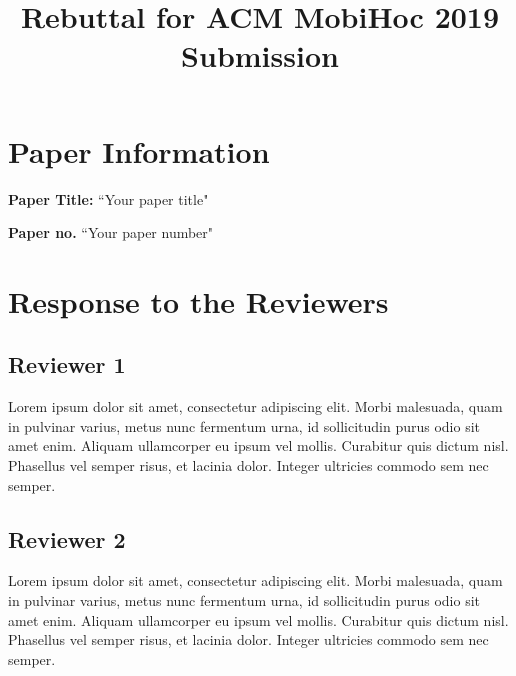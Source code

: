 \documentclass[nonacm,sigconf]{acmart}
\begin{document}
\title{Rebuttal for ACM MobiHoc 2019 Submission}

\maketitle





\section{Paper Information}

{\bf \noindent Paper Title:} ``Your paper title" 

{\bf \noindent Paper no.} ``Your paper number" 

\section{Response to the Reviewers}

\subsection{Reviewer 1}

Lorem ipsum dolor sit amet, consectetur adipiscing elit. Morbi malesuada, quam in pulvinar varius, metus nunc fermentum urna, id sollicitudin purus odio sit amet enim. Aliquam ullamcorper eu ipsum vel mollis. Curabitur quis dictum nisl. Phasellus vel semper risus, et lacinia dolor. Integer ultricies commodo sem nec semper.


\subsection{Reviewer 2}
Lorem ipsum dolor sit amet, consectetur adipiscing elit. Morbi malesuada, quam in pulvinar varius, metus nunc fermentum urna, id sollicitudin purus odio sit amet enim. Aliquam ullamcorper eu ipsum vel mollis. Curabitur quis dictum nisl. Phasellus vel semper risus, et lacinia dolor. Integer ultricies commodo sem nec semper.~\cite{Abril07}
\end{document}
